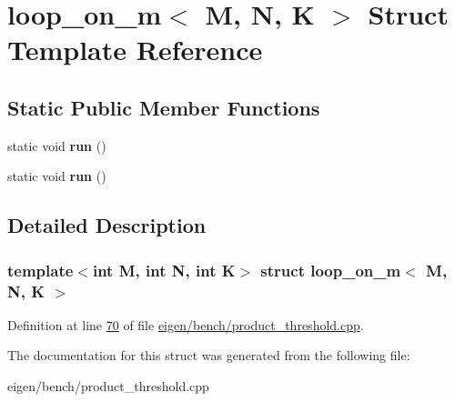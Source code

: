 \hypertarget{structloop__on__m}{}\section{loop\+\_\+on\+\_\+m$<$ M, N, K $>$ Struct Template Reference}
\label{structloop__on__m}
\subsection*{Static Public Member Functions}
\begin{DoxyCompactItemize}
\item 
\mbox{\label{structloop__on__m_a698c429512af6e3916dd4ffbc715061a}} 
static void {\bfseries run} ()
\item 
\mbox{\label{structloop__on__m_a698c429512af6e3916dd4ffbc715061a}} 
static void {\bfseries run} ()
\end{DoxyCompactItemize}


\subsection{Detailed Description}
\subsubsection*{template$<$int M, int N, int K$>$\newline
struct loop\+\_\+on\+\_\+m$<$ M, N, K $>$}



Definition at line \hyperlink{eigen_2bench_2product__threshold_8cpp_source_l00070}{70} of file \hyperlink{eigen_2bench_2product__threshold_8cpp_source}{eigen/bench/product\+\_\+threshold.\+cpp}.



The documentation for this struct was generated from the following file\+:\begin{DoxyCompactItemize}
\item 
eigen/bench/product\+\_\+threshold.\+cpp\end{DoxyCompactItemize}
